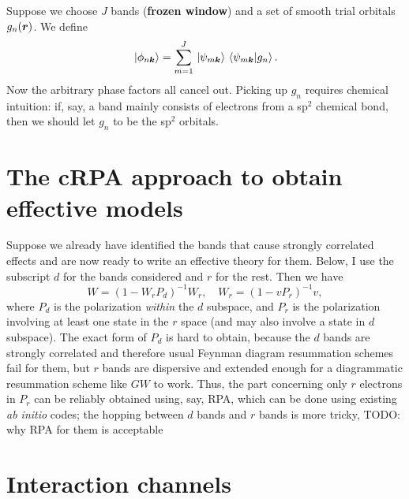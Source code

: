 \documentclass[hyperref, a4paper]{report}
\newcommand*{\concept}[1]{{\textbf{#1}}}
\newcommand*{\abinitio}{\textit{ab initio}}
\begin{document}
Suppose we choose $J$ bands (\concept{frozen window}) and a set of smooth trial orbitals $g_n(\vb*{r})$.
We define 
\begin{equation}
    \ket*{\phi_{n \vb*{k}}} = \sum_{m = 1}^J \ket*{\psi_{m \vb*{k}}} \braket*{\psi_{m \vb*{k}}}{g_n}.
\end{equation}
Now the arbitrary phase factors all cancel out. 
Picking up $g_n$ requires chemical intuition: 
if, say, a band mainly consists of electrons from a sp$^2$ chemical bond, 
then we should let $g_n$ to be the sp$^2$ orbitals. 

\section{The cRPA approach to obtain effective models}

Suppose we already have identified the bands that cause strongly correlated effects
and are now ready to write an effective theory for them.
Below, I use the subscript $d$ for the bands considered and $r$ for the rest.
Then we have\cite{aryasetiawan20117} 
\begin{equation}
    W = (1 - W_r P_d)^{-1} W_r, \quad 
    W_r = (1 - v P_r)^{-1}v,
\end{equation}
where $P_d$ is the polarization \emph{within} the $d$ subspace,
and $P_r$ is the polarization involving at least one state in the $r$ space 
(and may also involve a state in $d$ subspace).
The exact form of $P_d$ is hard to obtain,
because the $d$ bands are strongly correlated and therefore 
usual Feynman diagram resummation schemes fail for them,
but $r$ bands are dispersive and extended enough 
for a diagrammatic resummation scheme like $GW$ to work.
Thus, the part concerning only $r$ electrons in $P_r$ can be reliably 
obtained using, say, RPA, 
which can be done using existing \abinitio{} codes;
the hopping between $d$ bands and $r$ bands is more tricky,
TODO: why RPA for them is acceptable

\section{Interaction channels}
\end{document}
